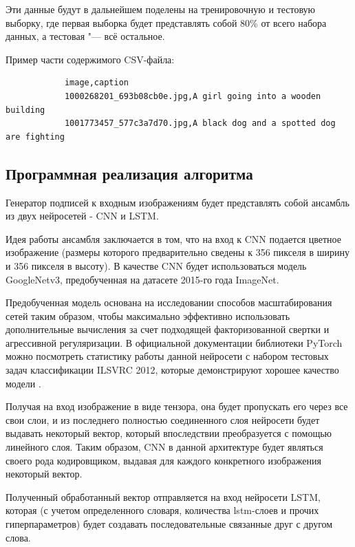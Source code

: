 \documentclass[bachelor, och, coursework]{SCWorks}
\begin{document}
        Эти данные будут в дальнейшем поделены на тренировочную и тестовую
        выборку, где первая выборка будет представлять собой 80\% от всего
        набора данных, а тестовая "--- всё остальное.

        Пример части содержимого CSV-файла:
        
        \begin{verbatim}
            image,caption
            1000268201_693b08cb0e.jpg,A girl going into a wooden building 
            1001773457_577c3a7d70.jpg,A black dog and a spotted dog are fighting
        \end{verbatim}

    \subsection{Программная реализация алгоритма}

        Генератор подписей к входным изображениям будет представлять собой
        ансамбль из двух нейросетей - CNN и LSTM.

        Идея работы ансамбля заключается в том, что на вход к CNN подается
        цветное изображение (размеры которого предварительно сведены к 356
        пикселя в ширину и 356 пикселя в высоту). В качестве CNN будет
        использоваться модель GoogleNetv3, предобученная на датасете 2015-го
        года ImageNet.
        
        Предобученная модель основана на исследовании способов масштабирования
        сетей таким образом, чтобы максимально эффективно использовать
        дополнительные вычисления за счет подходящей факторизованной свертки и
        агрессивной регуляризации. В официальной документации библиотеки PyTorch
        можно посмотреть статистику работы данной нейросети с набором тестовых
        задач классификации ILSVRC 2012, которые демонстрируют хорошее качество
        модели \cite{inception}.
        
        Получая на вход изображение в виде тензора, она будет пропускать его
        через все свои слои, и из последнего полностью соединенного слоя
        нейросети будет выдавать некоторый вектор, который впоследствии
        преобразуется с помощью линейного слоя. Таким образом, CNN в данной
        архитектуре будет являться своего рода кодировщиком, выдавая для каждого
        конкретного изображения некоторый вектор.
        
        Полученный обработанный вектор отправляется на вход нейросети LSTM,
        которая (с учетом определенного словаря, количества lstm-слоев и прочих
        гиперпараметров) будет создавать последовательные связанные друг с
        другом слова. 
        
\end{document}
